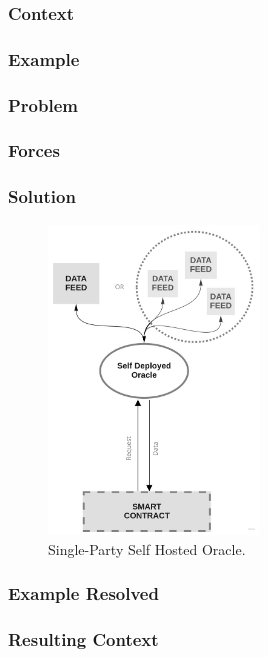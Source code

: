 \subsubsection{Context}
\subsubsection{Example}
\subsubsection{Problem}
\subsubsection{Forces}
\subsubsection{Solution}

\begin{figure}[t]
  \begin{center}
    \leavevmode
    \includegraphics[width=0.5\textwidth]{figures/oraclearch3.jpg}
    \caption{Single-Party Self Hosted Oracle.}
    \label{fig:/figures/paper-screening}
  \end{center}
\end{figure}


\subsubsection{Example Resolved}
\subsubsection{Resulting Context}
